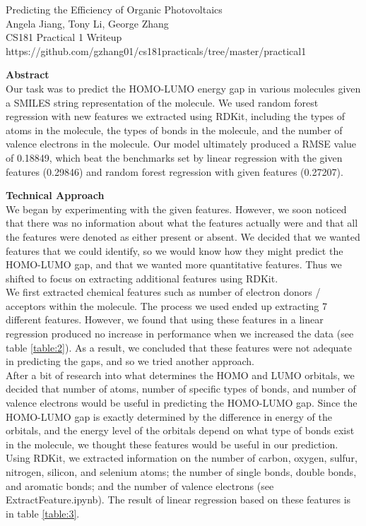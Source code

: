 \documentclass[12pt]{article}
\begin{document}
\begin{center}
Predicting the Efficiency of Organic Photovoltaics \\
Angela Jiang, Tony Li, George Zhang \\ 
CS181 Practical 1 Writeup \\
https://github.com/gzhang01/cs181practicals/tree/master/practical1 \\
\end{center}

\bigskip
\bigskip

\textbf{Abstract} \\
Our task was to predict the HOMO-LUMO energy gap in various molecules given a SMILES string representation of the molecule. We used random forest regression with new features we extracted using RDKit, including the types of atoms in the molecule, the types of bonds in the molecule, and the number of valence electrons in the molecule. Our model ultimately produced a RMSE value of 0.18849, which beat the benchmarks set by linear regression with the given features (0.29846) and random forest regression with given features (0.27207).  \\

\bigskip

\textbf{Technical Approach} \\
We began by experimenting with the given features. However, we soon noticed that there was no information about what the features actually were and that all the features were denoted as either present or absent. We decided that we wanted features that we could identify, so we would know how they might predict the HOMO-LUMO gap, and that we wanted more quantitative features. Thus we shifted to focus on extracting additional features using RDKit. \\

We first extracted chemical features such as number of electron donors / acceptors within the molecule. The process we used ended up extracting 7 different features. However, we found that using these features in a linear regression produced no increase in performance when we increased the data (see table \ref{table:2}). As a result, we concluded that these features were not adequate in predicting the gaps, and so we tried another approach. \\

After a bit of research into what determines the HOMO and LUMO orbitals, we decided that number of atoms, number of specific types of bonds, and number of valence electrons would be useful in predicting the HOMO-LUMO gap. Since the HOMO-LUMO gap is exactly determined by the difference in energy of the orbitals, and the energy level of the orbitals depend on what type of bonds exist in the molecule, we thought these features would be useful in our prediction. Using RDKit, we extracted information on the number of carbon, oxygen, sulfur, nitrogen, silicon, and selenium atoms; the number of single bonds, double bonds, and aromatic bonds; and the number of valence electrons (see ExtractFeature.ipynb). The result of linear regression based on these features is in table \ref{table:3}. \\
\end{document}
